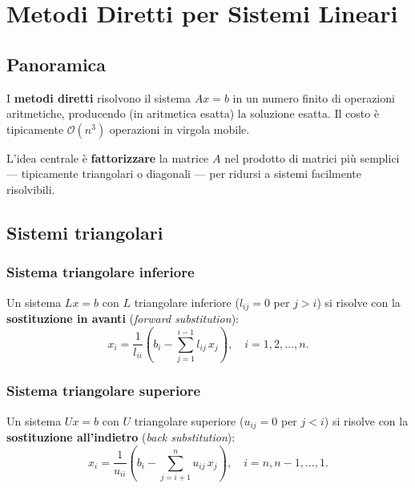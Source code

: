 \chapter{Metodi Diretti per Sistemi Lineari}
\label{ch:diretti}

\section{Panoramica}

I \textbf{metodi diretti} risolvono il sistema $Ax = b$ in un numero finito di
operazioni aritmetiche, producendo (in aritmetica esatta) la soluzione esatta.
Il costo è tipicamente $\mathcal{O}(n^3)$ operazioni in virgola mobile.

L'idea centrale è \textbf{fattorizzare} la matrice $A$ nel prodotto di matrici più
semplici — tipicamente triangolari o diagonali — per ridursi a sistemi facilmente
risolvibili.

\section{Sistemi triangolari}
\label{sec:triangolari}

\subsection{Sistema triangolare inferiore}

Un sistema $Lx = b$ con $L$ triangolare inferiore ($l_{ij} = 0$ per $j > i$) si
risolve con la \textbf{sostituzione in avanti} (\emph{forward substitution}):
\begin{equation}
  x_i = \frac{1}{l_{ii}}\left(b_i - \sum_{j=1}^{i-1} l_{ij}\, x_j\right),
  \quad i = 1, 2, \ldots, n.
  \label{eq:fwd_sub}
\end{equation}

\subsection{Sistema triangolare superiore}

Un sistema $Ux = b$ con $U$ triangolare superiore ($u_{ij} = 0$ per $j < i$) si
risolve con la \textbf{sostituzione all'indietro} (\emph{back substitution}):
\begin{equation}
  x_i = \frac{1}{u_{ii}}\left(b_i - \sum_{j=i+1}^{n} u_{ij}\, x_j\right),
  \quad i = n, n-1, \ldots, 1.
  \label{eq:bck_sub}
\end{equation}

